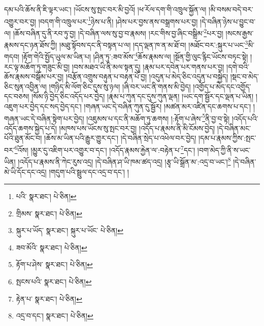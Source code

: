 དམ་པའི་ཆོས་ནི་ཇི་ལྟར་ཡང་། །ཡོངས་སུ་སྤང་བར་མི་བྱའོ། །ཕ་རོལ་དག་གི་འཁྲུལ་སྐྱོན་ལ། །མི་བསམ་བདེ་བར་འགྱུར་བར་བྱ། །བདག་གི་འཁྲུལ་པར་\footnote{པའི་  སྣར་ཐང་།  པེ་ཅིན། }ཉེས་པ་ནི། །ཤེས་པར་བྱས་ནས་བསྒྲགས་པར་བྱ། །དེ་བཞིན་ཉེས་པ་བྱུང་བ་ལ། །ཆོས་བཞིན་དུ་ནི་རབ་ཏུ་བྱ། །དེ་བཞིན་ལས་སུ་བྱ་བ་རྣམས། །རང་གིས་བྱ་ཞིང་བསྒྲིམ་\footnote{གྲིམས་  སྣར་ཐང་།  པེ་ཅིན། }པར་བྱ། །སངས་རྒྱས་རྣམས་དང་ཉན་ཐོས་ཀྱི། །མཐུ་སྟོབས་དང་ནི་བསྟན་པ་ལ། །དད་ལྡན་ཁ་ན་མ་ཐོ་བ། །མཐོང་བར་:སྐུར་པ་ཡང་\footnote{སྐུར་པ་ཡོད་  སྣར་ཐང་། སྐུར་པ་ཡོང་  པེ་ཅིན། }མི་གདབ། །རྟོག་གེའི་སྤྱོད་ཡུལ་མ་ཡིན་པ། །ཤིན་ཏུ་:ཟབ་མོས་\footnote{ཟབ་མོའི་  སྣར་ཐང་།  པེ་ཅིན། }ཆོས་རྣམས་ལ། །སྔོན་གྱི་ལུང་རྙིང་ཡོངས་བཏང་སྟེ། །རང་ལྟ་མཆོག་ཏུ་གཟུང་མི་བྱ། །བས་མཐའ་ཡི་ནི་མལ་སྟན་དུ། །རྣམ་པར་དབེན་པར་གནས་པར་བྱ། །དགེ་བའི་ཆོས་རྣམས་བསྒོམ་པར་བྱ། །བརྩོན་འགྲུས་བརྟུན་པ་བརྟན་པོ་བྱ། །འདུན་པ་མེད་ཅིང་འདུན་པ་བསྐྱེད། །སྡང་བ་མེད་ཅིང་སུན་འབྱིན་ལ། །གཉིད་མི་ལོག་ཅིང་དུས་སུ་ཉལ། །ཞི་བར་ཡང་ནི་གནས་མི་བྱེད། །འགྱོད་པ་མེད་དང་འགྱོད་དང་བཅས། །སོམ་ཉི་བྱེད་ཅིང་འདོད་པར་བྱེད། །རྣམ་པ་ཀུན་དང་དུས་ཀུན་ལྡན། །ཡང་དག་སྦྱོར་དང་ལྡན་པ་ཡིན། །འཇུག་པར་བྱེད་དང་སད་བྱེད་དང་། །གཞན་ཡང་དེ་བཞིན་ཀུན་དུ་སྦྱོར། །མཚན་མར་འཛིན་དང་ཆགས་པ་དང་། །གཞན་ཡང་དེ་བཞིན་སྟེག་པར་བྱེད། །འཇུམས་པ་དང་ནི་མཆོག་ཏུ་ཆགས། །:རྟོག་པ་ཞེས་\footnote{རྟོག་པ་ཤེས་  སྣར་ཐང་།  པེ་ཅིན། }ནི་བྱ་བ་སྟེ། །འདོད་པའི་འདོད་ཆགས་སྐྱེད་པ་དེ། །མཁས་པས་ཡོངས་སུ་སྤང་བར་བྱ། །འདོད་པ་རྣམས་ནི་མི་ངོམས་བྱེད། །དེ་བཞིན་མང་པོའི་ཐུན་མོང་བ། །ཆོས་མ་ཡིན་པའི་རྒྱུར་གྱུར་དང་། །དེ་བཞིན་སྲེད་པ་འཕེལ་བར་བྱེད། །དམ་པ་རྣམས་ཀྱིས་:སྤང་བར་\footnote{སྤངས་པའི་  སྣར་ཐང་།  པེ་ཅིན། }འོས། །མྱུར་དུ་འཇིག་པར་འགྱུར་བ་དང་། །འདོད་རྣམས་རྐྱེན་ལ་:བརྟེན་པ་\footnote{རྟེན་པ་  སྣར་ཐང་།  པེ་ཅིན། }དང་། །བག་མེད་ཀྱི་ནི་ས་ཡང་ཡིན། །འདོད་པ་རྣམས་ནི་ཀེང་རུས་འདྲ། །དེ་བཞིན་ཤ་ཡི་ཁམ་ཚད་འདྲ། །རྩྭ་ཡི་སྒྲོན་མ་:འདྲ་བ་ཡང་།\footnote{འདྲ་བ་དང་།  སྣར་ཐང་།  པེ་ཅིན། } །དེ་བཞིན་མེ་ཡི་དོང་དང་འདྲ། །གདུག་པའི་སྦྲུལ་དང་འདྲ་བ་དང་། །
